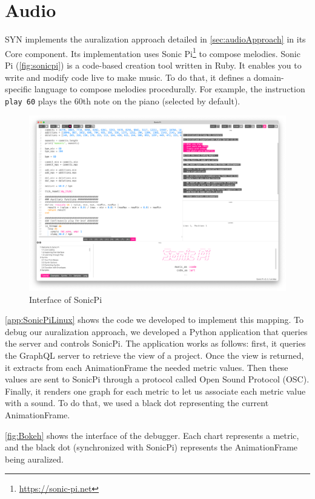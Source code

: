 \section{Audio}
SYN implements the auralization approach detailed in \autoref{sec:audioApproach} in its Core component. 
Its implementation uses Sonic Pi\footnote{\url{https://sonic-pi.net}} to compose melodies. Sonic Pi (\autoref{fig:sonicpi}) is a code-based creation tool written in Ruby. It enables you to write and modify code live to make music. To do that, it defines a domain-specific language to compose melodies procedurally. For example, the instruction \texttt{play 60} plays the 60th note on the piano (selected by default). 

\begin{figure}
    \center
    \includegraphics[width=\textwidth]{SonicPi.png}
    \caption{Interface of SonicPi}
    \label{fig:sonicpi}
\end{figure}

\autoref{app:SonicPiLinux} shows the code we developed to implement this mapping. To debug our auralization approach, we developed a Python application that queries the server and controls SonicPi. The application works as follows: first, it queries the GraphQL server to retrieve the view of a project. Once the view is returned, it extracts from each AnimationFrame the needed metric values. Then these values are sent to SonicPi through a protocol called Open Sound Protocol (OSC). Finally, it renders one graph for each metric to let us associate each metric value with a sound. To do that, we used a black dot representing the current AnimationFrame. 

\autoref{fig:Bokeh} shows the interface of the debugger. Each chart represents a metric, and the black dot (synchronized with SonicPi) represents the AnimationFrame being auralized. 

